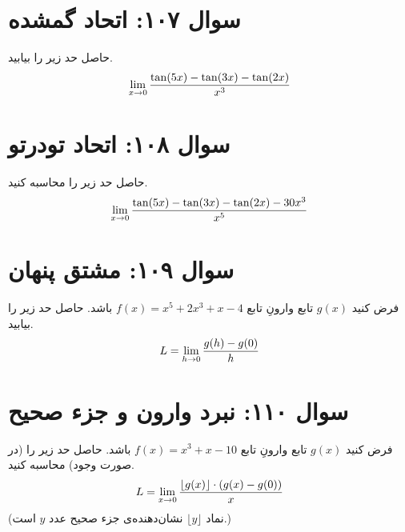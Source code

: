 \documentclass[12pt]{article}
\begin{document}
\section*{سوال ۱۰۷: اتحاد گمشده}
حاصل حد زیر را بیابید.
\begin{displaymath}
	\Large \lim_{x \to 0} \frac{\tan(5x) - \tan(3x) - \tan(2x)}{x^3}
\end{displaymath}

\vspace{1cm}
\hrulefill
\vspace{1cm}

\section*{سوال ۱۰۸: اتحاد تودرتو}
حاصل حد زیر را محاسبه کنید.
\begin{displaymath}
	\Large \lim_{x \to 0} \frac{\tan(5x) - \tan(3x) - \tan(2x) - 30x^3}{x^5}
\end{displaymath}

\vspace{1cm}
\hrulefill
\vspace{1cm}
\section*{سوال ۱۰۹: مشتق پنهان}
فرض کنید \(g(x)\) تابع وارونِ تابع \( f(x) = x^5 + 2x^3 + x - 4 \) باشد. حاصل حد زیر را بیابید.
\begin{displaymath}
	\Large L = \lim_{h \to 0} \frac{g(h) - g(0)}{h}
\end{displaymath}

\vspace{1cm}
\hrulefill
\vspace{1cm}

\section*{سوال ۱۱۰: نبرد وارون و جزء صحیح}
فرض کنید \(g(x)\) تابع وارونِ تابع \( f(x) = x^3 + x - 10 \) باشد. حاصل حد زیر را (در صورت وجود) محاسبه کنید.
\begin{displaymath}
	\Large L = \lim_{x \to 0} \frac{\lfloor g(x) \rfloor \cdot (g(x) - g(0))}{x}
\end{displaymath}
(نماد \( \lfloor y \rfloor \) نشان‌دهنده‌ی جزء صحیح عدد \(y\) است.)
\end{document}
